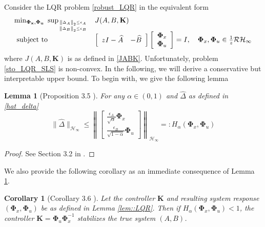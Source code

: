 \documentclass{article}[12pt]
\newtheorem{corollary}{Corollary}
\newtheorem{lemma}{Lemma}
\begin{document}
Consider the LQR problem \eqref{robust_LQR} in the equivalent form
\begin{equation}
\label{sto_LQR_SLS}
\begin{array}{ll}{\operatorname{min}_{\mathbf{\Phi_x},\mathbf{\Phi_u}} \ \sup _{\left\|\Delta_{A}\right\|_{2} \leq \epsilon_{A} \atop\left\|\Delta_{B}\right\|_{2} \leq \epsilon_{B}}} & {J(A, B, \mathbf{K})} \\ {\text { subject to }} & {\left[\begin{array}{cc}{z I-\widehat{A}} & {-\widehat{B}}\end{array}\right]\left[\begin{array}{c}{\mathbf{\Phi}_{x}} \\ {\mathbf{\Phi}_{u}}\end{array}\right]=I, \quad \mathbf{\Phi}_{x}, \mathbf{\Phi}_{u} \in \frac{1}{z} \mathcal{R} \mathcal{H}_{\infty}}\end{array}
\end{equation}
where $J(A, B, \mathbf{K})$ is as defined in \eqref{JABK}. Unfortunately, problem \eqref{sto_LQR_SLS} is non-convex.
In the following, we will derive a conservative but interpretable upper bound. To begin with, we give the following lemma
\begin{lemma}[Proposition 3.5 \cite{dean2017sample}]
\label{lem::upper_bound}
For any $\alpha \in(0,1)$ and $\hat{\Delta}$
as defined in \eqref{hat_delta}
\begin{equation}
    \|\hat{\Delta}\|_{\mathcal{H}_{\infty}} \leq\left\|\left[\begin{array}{c}{\frac{\epsilon_{A}}{\sqrt{\alpha}} \mathbf{\Phi}_{x}} \\ {\frac{\epsilon_{B}}{\sqrt{1-\alpha}} \mathbf{\Phi}_{u}}\end{array}\right]\right\|_{\mathcal{H}_{\infty}}=: H_{\alpha}\left(\mathbf{\Phi}_{x}, \mathbf{\Phi}_{u}\right)
\end{equation}
\end{lemma}
\begin{proof}
See Section 3.2 in \cite{dean2017sample}.
\end{proof}
We also provide the following corollary as an immediate consequence of Lemma \ref{lem::upper_bound}.
\begin{corollary}[Corollary 3.6 \cite{dean2017sample}]
\label{coro::stab}
Let the controller $\mathbf{K}$ and resulting system response $\left(\mathbf{\Phi}_{x}, \mathbf{\Phi}_{u}\right)$ be as defined in Lemma \ref{lem::LQR}.
Then if $H_{\alpha}\left(\mathbf{\Phi}_{x}, \mathbf{\Phi}_{u}\right)<1$, the controller $\mathbf{K}=\mathbf{\Phi}_{u} \mathbf{\Phi}_{x}^{-1}$ stabilizes the true system $(A,B)$.
\end{corollary}
\end{document}
